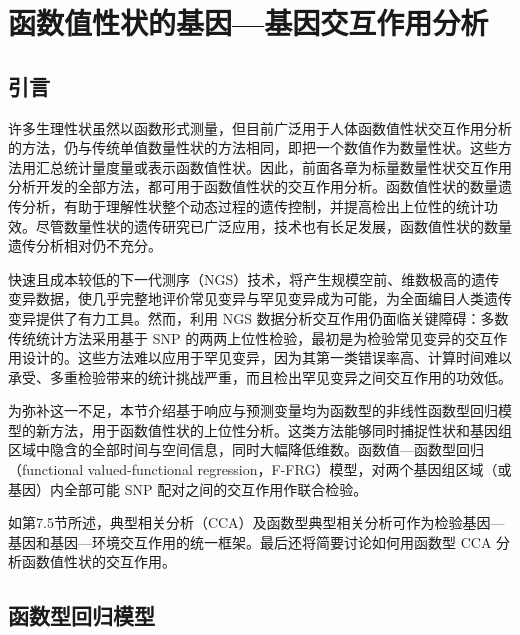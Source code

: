 \section{函数值性状的基因—基因交互作用分析}
\subsection{引言}

许多生理性状虽然以函数形式测量，但目前广泛用于人体函数值性状交互作用分析的方法，仍与传统单值数量性状的方法相同，即把一个数值作为数量性状。这些方法用汇总统计量度量或表示函数值性状。因此，前面各章为标量数量性状交互作用分析开发的全部方法，都可用于函数值性状的交互作用分析。函数值性状的数量遗传分析，有助于理解性状整个动态过程的遗传控制，并提高检出上位性的统计功效。尽管数量性状的遗传研究已广泛应用，技术也有长足发展，函数值性状的数量遗传分析相对仍不充分。

快速且成本较低的下一代测序（NGS）技术，将产生规模空前、维数极高的遗传变异数据，使几乎完整地评价常见变异与罕见变异成为可能，为全面编目人类遗传变异提供了有力工具。然而，利用 NGS 数据分析交互作用仍面临关键障碍：多数传统统计方法采用基于 SNP 的两两上位性检验，最初是为检验常见变异的交互作用设计的。这些方法难以应用于罕见变异，因为其第一类错误率高、计算时间难以承受、多重检验带来的统计挑战严重，而且检出罕见变异之间交互作用的功效低。

为弥补这一不足，本节介绍基于响应与预测变量均为函数型的非线性函数型回归模型的新方法，用于函数值性状的上位性分析。这类方法能够同时捕捉性状和基因组区域中隐含的全部时间与空间信息，同时大幅降低维数。函数值—函数型回归（functional valued-functional regression，F-FRG）模型，对两个基因组区域（或基因）内全部可能 SNP 配对之间的交互作用作联合检验。

如第7.5节所述，典型相关分析（CCA）及函数型典型相关分析可作为检验基因—基因和基因—环境交互作用的统一框架。最后还将简要讨论如何用函数型 CCA 分析函数值性状的交互作用。

\subsection{函数型回归模型}

